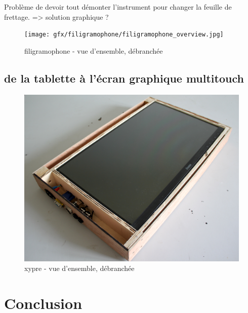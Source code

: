 Problème de devoir tout démonter l'instrument pour changer la feuille de frettage. => solution graphique ?

\begin{figure}[htb]
	\texttt{[image: gfx/filigramophone/filigramophone\_overview.jpg]}
	\caption{filigramophone - vue d'ensemble, débranchée}
	\label{fig:interface:filigramophone}
\end{figure}

\subsection{de la tablette à l'écran graphique multitouch}
\begin{figure}[htb]
	\includegraphics[width=\textwidth]{gfx/xypre/xypre_overview_unplugged.jpg}
	\caption{xypre - vue d'ensemble, débranchée}
	\label{fig:interface:xypre}
\end{figure}

\section{Conclusion}
\label{sec:interfaces:conclusion}
